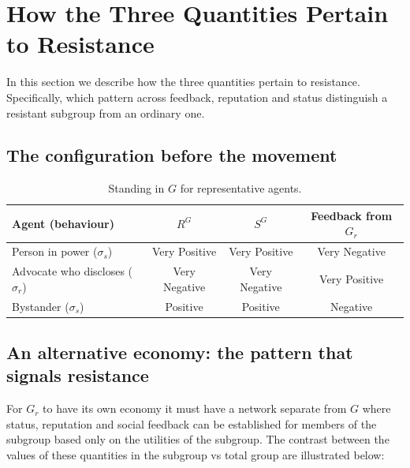 \documentclass[11pt]{article}
\newcommand{\Gr}{G_{r}}          %
\newcommand{\sd}{\sigma_{s}}     %
\newcommand{\sr}{\sigma_{r}}     %
\theoremstyle{definition}
\theoremstyle{remark}
\begin{document}
\section{How the Three Quantities Pertain to Resistance}
In this section we describe how the three quantities pertain to resistance. Specifically,
which pattern across feedback, reputation and status distinguish a resistant subgroup from an ordinary one.

\subsection{The configuration before the movement}
\begin{table}[h]
\centering
\begin{tabular}{lccc}
\toprule
Agent (behaviour) & $R^{G}$ & $S^{G}$ & Feedback from $\Gr$ \\
\midrule
Person in power ($\sd$)    & Very Positive & Very Positive & Very Negative \\
Advocate who discloses ($\sr$) & Very Negative & Very Negative & Very Positive \\
Bystander ($\sd$)          & Positive & Positive & Negative \\
\bottomrule
\end{tabular}
\caption{Standing in $G$ for representative agents.}
\end{table}

\subsection{An alternative economy: the pattern that signals resistance}
For $G_r$ to have its own economy it must have a network separate from $G$
where status, reputation and social feedback can be established for members of the subgroup
based only on the utilities of the subgroup. The contrast between the values
of these quantities in the subgroup vs total group are illustrated below:
\end{document}

